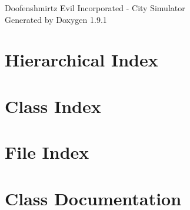 \let\mypdfximage\pdfximage\def\pdfximage{\immediate\mypdfximage}\documentclass[twoside]{book}
\newcommand{\+}{\discretionary{\mbox{\scriptsize$\hookleftarrow$}}{}{}}
\newcommand{\clearemptydoublepage}{%
  \newpage{\pagestyle{empty}\cleardoublepage}%
}
\begin{document}
\raggedbottom

\hypersetup{pageanchor=false,
             bookmarksnumbered=true,
             pdfencoding=unicode
            }
\begin{titlepage}
\vspace*{7cm}
\begin{center}%
{\Large Doofenshmirtz Evil Incorporated -\/ City Simulator }\\
\vspace*{1cm}
{\large Generated by Doxygen 1.9.1}\\
\end{center}
\end{titlepage}
\clearemptydoublepage
{}
\tableofcontents
\clearemptydoublepage
{}
\hypersetup{pageanchor=true}

\chapter{Hierarchical Index}

\chapter{Class Index}

\chapter{File Index}

\chapter{Class Documentation}













































\end{document}
